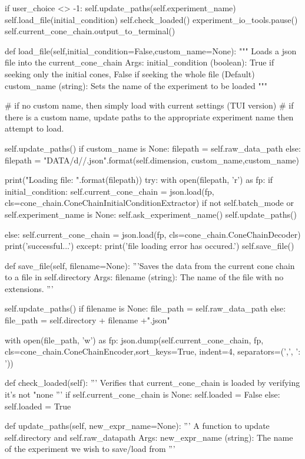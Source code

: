 \documentclass{TC}
\begin{document}
\begin{SAGE}
		if user_choice <> -1:
			self.update_paths(self.experiment_name)
			self.load_file(initial_condition)
			self.check_loaded()
			experiment_io_tools.pause()
			self.current_cone_chain.output_to_terminal()


	def load_file(self,initial_condition=False,custom_name=None):
		""" Loads a json file into the current_cone_chain 
			Args:
				initial_condition (boolean): 	True if seeking only the initial cones, 
					False if seeking the whole file (Default)
				custom_name (string):	Sets the name of the experiment to be loaded
		"""

		# if no custom name, then simply load with current settings (TUI version)
		# if there is a custom name, update paths to the appropriate experiment name then attempt to load.

		self.update_paths()
		if custom_name is None:
			filepath = self.raw_data_path
		else:
			filepath = "DATA/{}d/{}/{}.json".format(self.dimension, custom_name,custom_name)

		print("Loading file: {}".format(filepath))
		try:
			with open(filepath, 'r') as fp:
				if initial_condition:
					self.current_cone_chain = json.load(fp, cls=cone_chain.ConeChainInitialConditionExtractor)
					if not self.batch_mode or self.experiment_name is None:
						self.ask_experiment_name()
					self.update_paths()
					
				else:
					self.current_cone_chain = json.load(fp, cls=cone_chain.ConeChainDecoder)
			print('\tloading successful...')
		except:
			print('\tA file loading error has occured.')
		self.save_file()

	def save_file(self, filename=None):
		'''Saves the data from the current cone chain to a file in self.directory
			Args: filename (string): The name of the file with no extensions.
		'''

		self.update_paths()		
		if filename is None:
			file_path = self.raw_data_path
		else:
			file_path = self.directory + filename +".json"

		with open(file_path, 'w') as fp:
			json.dump(self.current_cone_chain, fp, cls=cone_chain.ConeChainEncoder,sort_keys=True,
				indent=4, separators=(',', ': '))
	
	def check_loaded(self):
		''' Verifies that current_cone_chain is loaded by verifying it's not "none '''
		if self.current_cone_chain is None:
			self.loaded = False
		else:
			self.loaded = True


	def update_paths(self, new_expr_name=None):
		''' A function to update self.directory and self.raw_datapath
			Args: new_expr_name (string): The name of the experiment we wish to save/load from	
		'''
		

\end{SAGE}
\end{document}
